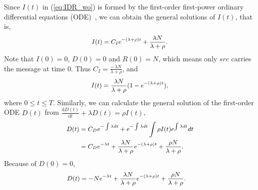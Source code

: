 Since $I(t)$ in (\ref{eq:IDR_wo}) is formed by the first-order first-power
ordinary differential equations (ODE)~\cite{CC2007PerfAnaly},
we can obtain the general solutions of $I(t)$, that is,
\begin{equation}
\begin{small}
\nonumber
\begin{aligned}
I(t) = C_{I} e^{-(\lambda + \rho)t}
+ \frac{ \lambda N }{ \lambda + \rho }.
\end{aligned}
\end{small}
\end{equation}
Note that $I(0)=0$, $D(0)=0$ and $R(0)=N$,
which means only $src$ carries the message at time $0$.
Thus $C_{I} = \frac{ -\lambda N }{ \lambda + \rho }$, and
\begin{equation}
\begin{small}
\nonumber
\begin{aligned}
I(t) = \frac{ \lambda N }{ \lambda + \rho }(1- e^{-(\lambda + \rho)t}),
\end{aligned}
\end{small}
\end{equation}
where $0 \le t \le T$.
Similarly, we can calculate
the general solution of the first-order ODE $D(t)$
from $\frac{\mathrm{d} D(t)}{\mathrm{d} t} + \lambda D(t) = \rho I(t)$,
\begin{equation}
\begin{small}
\label{eq:D_formula}
\begin{aligned}
D(t) &= C_{D} e^{-\int \lambda dt} + e^{-\int \lambda dt}
\int \rho I(t) e^{\int \lambda dt} dt \\
&= C_{D} e^{- \lambda t} + \frac{ \lambda N }{ \lambda + \rho }
e^{-(\lambda + \rho)t} + \frac{ \rho N }{ \lambda + \rho }.
\end{aligned}
\end{small}
\end{equation}
Because of $D(0)=0$,
\begin{equation}
\begin{small}
\nonumber
\begin{aligned}
D(t) &= -N e^{- \lambda t} + \frac{ \lambda N }{ \lambda + \rho } e^{-(\lambda + \rho)t} + \frac{ \rho N }{ \lambda + \rho }.
\end{aligned}
\end{small}
\end{equation}
